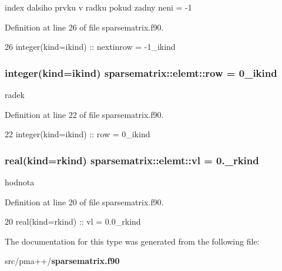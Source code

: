 index dalsiho prvku v radku pokud zadny neni = -\/1 



Definition at line 26 of file sparsematrix.\+f90.


\begin{DoxyCode}
26         \textcolor{keywordtype}{integer(kind=ikind)} :: nextinrow = -1\_ikind
\end{DoxyCode}
\subsubsection[{row}]{\setlength{\rightskip}{0pt plus 5cm}integer(kind=ikind) sparsematrix\+::elemt\+::row = 0\+\_\+ikind}\label{structsparsematrix_1_1elemt_a4961066c0fdc032c68f7f012e43aae2d}


radek 



Definition at line 22 of file sparsematrix.\+f90.


\begin{DoxyCode}
22         \textcolor{keywordtype}{integer(kind=ikind)} :: row = 0\_ikind
\end{DoxyCode}
\subsubsection[{vl}]{\setlength{\rightskip}{0pt plus 5cm}real(kind=rkind) sparsematrix\+::elemt\+::vl = 0.\+\_\+rkind}\label{structsparsematrix_1_1elemt_a3b06067edc9e6aab3496b10bb12e6d93}


hodnota 



Definition at line 20 of file sparsematrix.\+f90.


\begin{DoxyCode}
20         \textcolor{keywordtype}{real(kind=rkind)} :: vl = 0.0\_rkind
\end{DoxyCode}


The documentation for this type was generated from the following file\+:\begin{DoxyCompactItemize}
\item 
src/pma++/{\bf sparsematrix.\+f90}\end{DoxyCompactItemize}
